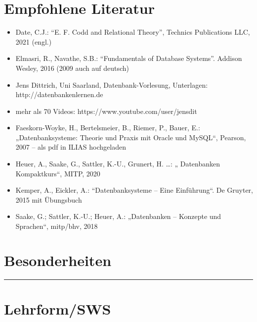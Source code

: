 \hypertarget{empfohlene-literaturpathlabel....srcmodulbeschreibungen-bachelor-bpo5ba_datenbanksysteme}{%
\section*{Empfohlene
Literatur\label{../../src/modulbeschreibungen-bachelor-bpo5/BA_Datenbanksysteme}}\label{empfohlene-literaturpathlabel....srcmodulbeschreibungen-bachelor-bpo5ba_datenbanksysteme}}

\begin{itemize}
\tightlist
\item
  Date, C.J.: ``E. F. Codd and Relational Theory'', Technics
  Publications LLC, 2021 (engl.)
\item
  Elmasri, R., Navathe, S.B.: ``Fundamentals of Database Systems''.
  Addison Wesley, 2016 (2009 auch auf deutsch)
\item
  Jens Dittrich, Uni Saarland, Datenbank-Vorlesung, Unterlagen:
  http://datenbankenlernen.de
\item
  mehr als 70 Videos: https://www.youtube.com/user/jensdit
\item
  Faeskorn-Woyke, H., Bertelsmeier, B., Riemer, P., Bauer, E.:
  „Datenbanksysteme: Theorie und Praxis mit Oracle und MySQL``, Pearson,
  2007 -- als pdf in ILIAS hochgeladen
\item
  Heuer, A., Saake, G., Sattler, K.-U., Grunert, H. \ldots: „
  Datenbanken Kompaktkurs``, MITP, 2020
\item
  Kemper, A., Eickler, A.: ``Datenbanksysteme -- Eine Einführung``. De
  Gruyter, 2015 mit Übungsbuch
\item
  Saake, G.; Sattler, K.-U.; Heuer, A.: „Datenbanken -- Konzepte und
  Sprachen``, mitp/bhv, 2018
\end{itemize}

\hypertarget{besonderheitenpathlabel....srcmodulbeschreibungen-bachelor-bpo5ba_datenbanksysteme}{%
\section*{Besonderheiten\label{../../src/modulbeschreibungen-bachelor-bpo5/BA_Datenbanksysteme}}\label{besonderheitenpathlabel....srcmodulbeschreibungen-bachelor-bpo5ba_datenbanksysteme}}

\begin{center}\rule{0.5\linewidth}{0.5pt}\end{center}

\hypertarget{lehrformswspathlabel....srcmodulbeschreibungen-bachelor-bpo5ba_datenbanksysteme}{%
\section*{Lehrform/SWS\label{../../src/modulbeschreibungen-bachelor-bpo5/BA_Datenbanksysteme}}\label{lehrformswspathlabel....srcmodulbeschreibungen-bachelor-bpo5ba_datenbanksysteme}}

